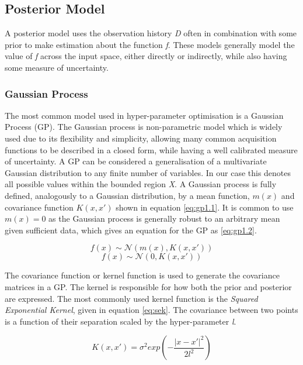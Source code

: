 	\subsection{Posterior Model}

		A posterior model uses the observation history \textit{D} often in combination with some prior to make estimation about the function \textit{f}. These models generally model the value of \textit{f} across the input space, either directly or indirectly, while also having some measure of uncertainty.




		\subsubsection{Gaussian Process}

			The most common model used in hyper-parameter optimisation is a Gaussian Process (GP)\cite{17}. The Gaussian process is non-parametric model which is widely used due to its flexibility and simplicity, allowing many common acquisition functions to be described in a closed form, while having a well calibrated measure of uncertainty. A GP can be considered a generalisation of a multivariate Gaussian distribution to any finite number of variables. In our case this denotes all possible values within the bounded region \textit{X}. A Gaussian process is fully defined, analogously to a Gaussian distribution, by a mean function, \(m(x)\) and covariance function \(K(x,x')\) shown in equation \ref{eq:gp1.1}. It is common to use \(m(x) = 0\) as the Gaussian process is generally robust to an arbitrary mean given sufficient data, which gives an equation for the GP as \ref{eq:gp1.2}.

			\begin{equation}\label{eq:gp1.1}f(x) \sim  \mathcal{N}(m(x) , K(x,x'))\end{equation}
			\begin{equation}\label{eq:gp1.2}f(x) \sim  \mathcal{N}(0 , K(x,x'))\end{equation}

			The covariance function or kernel function is used to generate the covariance matrices in a GP. The kernel is responsible for how both the prior and posterior are expressed. The most commonly used kernel function is the \textit{Squared Exponential Kernel}, given in equation \ref{eq:sek}. The covariance between two points is a function of their separation scaled by the hyper-parameter \textit{l}. 

			\begin{equation} \label{eq:sek} K(x,x') = \sigma^2 exp\left(-\frac{\mathopen|x - x'\mathclose|^2}{2l^2}\right)\end{equation}

